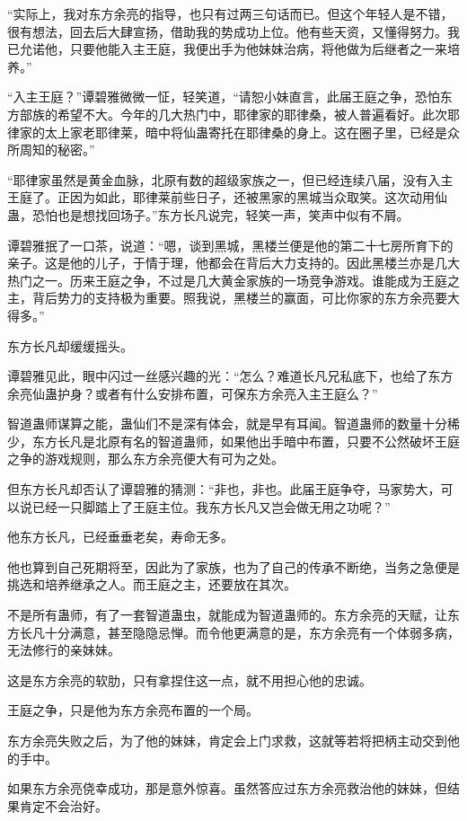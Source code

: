 \begin{this_body}
“实际上，我对东方余亮的指导，也只有过两三句话而已。但这个年轻人是不错，很有想法，回去后大肆宣扬，借助我的势成功上位。他有些天资，又懂得努力。我已允诺他，只要他能入主王庭，我便出手为他妹妹治病，将他做为后继者之一来培养。”

“入主王庭？”谭碧雅微微一怔，轻笑道，“请恕小妹直言，此届王庭之争，恐怕东方部族的希望不大。今年的几大热门中，耶律家的耶律桑，被人普遍看好。此次耶律家的太上家老耶律莱，暗中将仙蛊寄托在耶律桑的身上。这在圈子里，已经是众所周知的秘密。”

“耶律家虽然是黄金血脉，北原有数的超级家族之一，但已经连续八届，没有入主王庭了。正因为如此，耶律莱前些日子，还被黑家的黑城当众取笑。这次动用仙蛊，恐怕也是想找回场子。”东方长凡说完，轻笑一声，笑声中似有不屑。

谭碧雅抿了一口茶，说道：“嗯，谈到黑城，黑楼兰便是他的第二十七房所育下的亲子。这是他的儿子，于情于理，他都会在背后大力支持的。因此黑楼兰亦是几大热门之一。历来王庭之争，不过是几大黄金家族的一场竞争游戏。谁能成为王庭之主，背后势力的支持极为重要。照我说，黑楼兰的赢面，可比你家的东方余亮要大得多。”

东方长凡却缓缓摇头。

谭碧雅见此，眼中闪过一丝感兴趣的光：“怎么？难道长凡兄私底下，也给了东方余亮仙蛊护身？或者有什么安排布置，可保东方余亮入主王庭么？”

智道蛊师谋算之能，蛊仙们不是深有体会，就是早有耳闻。智道蛊师的数量十分稀少，东方长凡是北原有名的智道蛊师，如果他出手暗中布置，只要不公然破坏王庭之争的游戏规则，那么东方余亮便大有可为之处。

但东方长凡却否认了谭碧雅的猜测：“非也，非也。此届王庭争夺，马家势大，可以说已经一只脚踏上了王庭主位。我东方长凡又岂会做无用之功呢？”

他东方长凡，已经垂垂老矣，寿命无多。

他也算到自己死期将至，因此为了家族，也为了自己的传承不断绝，当务之急便是挑选和培养继承之人。而王庭之主，还要放在其次。

不是所有蛊师，有了一套智道蛊虫，就能成为智道蛊师的。东方余亮的天赋，让东方长凡十分满意，甚至隐隐忌惮。而令他更满意的是，东方余亮有一个体弱多病，无法修行的亲妹妹。

这是东方余亮的软肋，只有拿捏住这一点，就不用担心他的忠诚。

王庭之争，只是他为东方余亮布置的一个局。

东方余亮失败之后，为了他的妹妹，肯定会上门求救，这就等若将把柄主动交到他的手中。

如果东方余亮侥幸成功，那是意外惊喜。虽然答应过东方余亮救治他的妹妹，但结果肯定不会治好。


\end{this_body}
